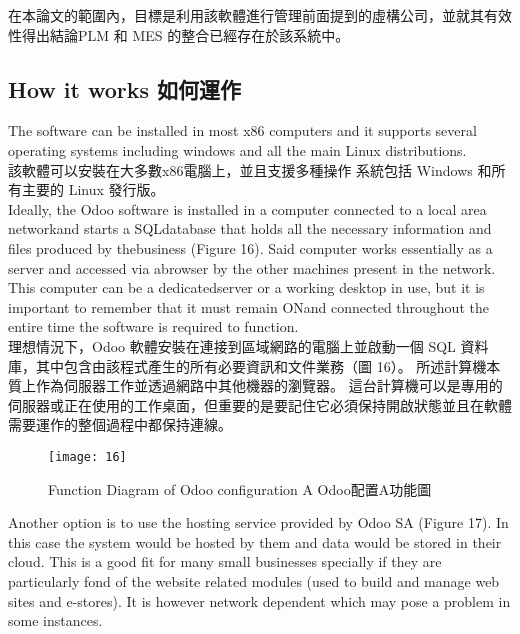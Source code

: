 \fontsize{12}{2.5pt}\sectionef 
{在本論文的範圍內，目標是利用該軟體進行管理前面提到的虛構公司，並就其有效性得出結論PLM 和 MES 的整合已經存在於該系統中。}\\[15pt]

\subsection{How it works 如何運作 }
\fontsize{12}{2.5pt}\sectionef 
 {The software can be installed in most x86 computers and it supports several operating
systems including windows and all the main Linux distributions.}\\[1pt]

\fontsize{12}{2.5pt}\sectionef  
{該軟體可以安裝在大多數x86電腦上，並且支援多種操作
系統包括 Windows 和所有主要的 Linux 發行版。}\\[15pt]

\fontsize{12}{2.5pt}\sectionef 
 {Ideally, the Odoo software is installed in a computer connected to a local area networkand starts a SQLdatabase that holds all the necessary information and files produced by thebusiness (Figure 16). Said computer works essentially as a server and accessed via abrowser by the other machines present in the network. This computer can be a dedicatedserver or a working desktop in use, but it is important to remember that it must remain ONand connected throughout the entire time the software is required to function.}\\[1pt]

\fontsize{12}{2.5pt}\sectionef  
{理想情況下，Odoo 軟體安裝在連接到區域網路的電腦上並啟動一個 SQL 資料庫，其中包含由該程式產生的所有必要資訊和文件業務（圖 16）。 所述計算機本質上作為伺服器工作並透過網路中其他機器的瀏覽器。 這台計算機可以是專用的伺服器或正在使用的工作桌面，但重要的是要記住它必須保持開啟狀態並且在軟體需要運作的整個過程中都保持連線。}
\\[15pt]


\begin{figure}[hbt!]
\begin{center}
\texttt{[image: 16]}
\caption{\Large  Function Diagram of Odoo configuration A Odoo配置A功能圖}\label{fig.16}
\end{center}
\end{figure}


\fontsize{12}{2.5pt}\sectionef 
 {Another option is to use the hosting service provided by Odoo SA (Figure 17). In this case
the system would be hosted by them and data would be stored in their cloud. This is a good
fit for many small businesses specially if they are particularly fond of the website related
modules (used to build and manage web sites and e-stores). It is however network dependent
which may pose a problem in some instances.}\\[1pt]

